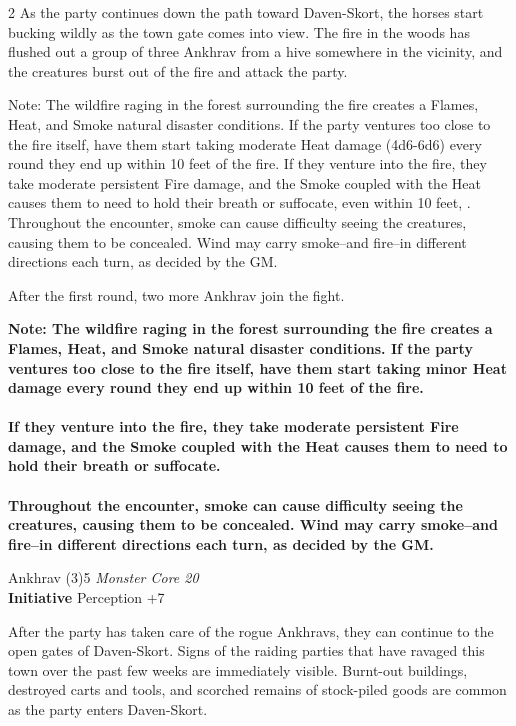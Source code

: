 \begin{multicols}{2}
As the party continues down the path toward Daven-Skort, the horses start bucking wildly as the town gate comes into view. The fire in the woods has flushed out a group of three Ankhrav from a hive somewhere in the vicinity, and the creatures burst out of the fire and attack the party.

Note: The wildfire raging in the forest surrounding the fire creates a Flames, Heat, and Smoke natural disaster conditions. If the party ventures too close to the fire itself, have them start taking moderate Heat damage (4d6-6d6) every round they end up within 10 feet of the fire. If they venture into the fire, they take moderate persistent Fire damage, and the Smoke coupled with the Heat causes them to need to hold their breath or suffocate, even within 10 feet, . Throughout the encounter, smoke can cause difficulty seeing the creatures, causing them to be concealed. Wind may carry smoke--and fire--in different directions each turn, as decided by the GM.

After the first round, two more Ankhrav join the fight.

  \textbf{Note: The wildfire raging in the forest surrounding the fire creates a Flames, Heat, and Smoke natural disaster conditions. If the party ventures too close to the fire itself, have them start taking minor Heat damage every round they end up within 10 feet of the fire. \\\\If they venture into the fire, they take moderate persistent Fire damage, and the Smoke coupled with the Heat causes them to need to hold their breath or suffocate. \\\\Throughout the encounter, smoke can cause difficulty seeing the creatures, causing them to be concealed. Wind may carry smoke--and fire--in different directions each turn, as decided by the GM.}

  \begin{creaturebox}{Ankhrav (3)}{5}
    \textit{Monster Core 20}\\
    \textbf{Initiative} Perception +7
  \end{creaturebox}

After the party has taken care of the rogue Ankhravs, they can continue to the open gates of Daven-Skort. Signs of the raiding parties that have ravaged this town over the past few weeks are immediately visible. Burnt-out buildings, destroyed carts and tools, and scorched remains of stock-piled goods are common as the party enters Daven-Skort.


\end{multicols}
